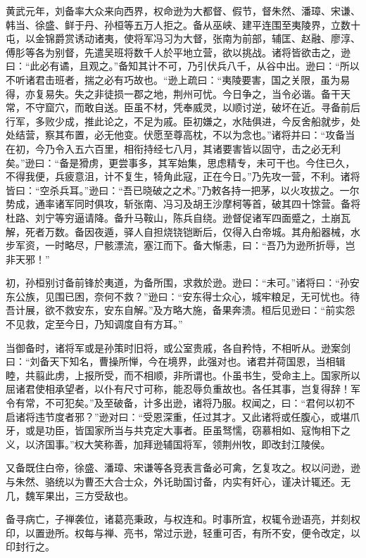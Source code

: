 \documentclass[12pt,UTF8]{ctexbook}
\begin{document}
黄武元年，刘备率大众来向西界，权命逊为大都督、假节，督朱然、潘璋、宋谦、韩当、徐盛、鲜于丹、孙桓等五万人拒之。备从巫峡、建平连围至夷陵界，立数十屯，以金锦爵赏诱动诸夷，使将军冯习为大督，张南为前部，辅匡、赵融、廖淳、傅肜等各为别督，先遣吴班将数千人於平地立营，欲以挑战。诸将皆欲击之，逊曰：“此必有谲，且观之。”备知其计不可，乃引伏兵八千，从谷中出。逊曰：“所以不听诸君击班者，揣之必有巧故也。“逊上疏曰：“夷陵要害，国之关限，虽为易得，亦复易失。失之非徒损一郡之地，荆州可忧。今日争之，当令必谐。备干天常，不守窟穴，而敢自送。臣虽不材，凭奉威灵，以顺讨逆，破坏在近。寻备前后行军，多败少成，推此论之，不足为戚。臣初嫌之，水陆俱进，今反舍船就步，处处结营，察其布置，必无他变。伏愿至尊高枕，不以为念也。”诸将并曰：“攻备当在初，今乃令入五六百里，相衔持经七八月，其诸要害皆以固守，击之必无利矣。”逊曰：“备是猾虏，更尝事多，其军始集，思虑精专，未可干也。今住已久，不得我便，兵疲意沮，计不复生，犄角此寇，正在今日。”乃先攻一营，不利。诸将皆曰：“空杀兵耳。”逊曰：“吾已晓破之之术。”乃敕各持一把茅，以火攻拔之。一尔势成，通率诸军同时俱攻，斩张南、冯习及胡王沙摩柯等首，破其四十馀营。备将杜路、刘宁等穷逼请降。备升马鞍山，陈兵自绕。逊督促诸军四面蹙之，土崩瓦解，死者万数。备因夜遁，驿人自担烧铙铠断后，仅得入白帝城。其舟船器械，水步军资，一时略尽，尸骸漂流，塞江而下。备大惭恚，曰：“吾乃为逊所折辱，岂非天邪！”

初，孙桓别讨备前锋於夷道，为备所围，求救於逊。逊曰：“未可。”诸将曰：“孙安东公族，见围已困，奈何不救？”逊曰：“安东得士众心，城牢粮足，无可忧也。待吾计展，欲不救安东，安东自解。”及方略大施，备果奔溃。桓后见逊曰：“前实怨不见救，定至今日，乃知调度自有方耳。”

当御备时，诸将军或是孙策时旧将，或公室贵戚，各自矜恃，不相听从。逊案剑曰：“刘备天下知名，曹操所惮，今在境界，此强对也。诸君并荷国恩，当相辑睦，共翦此虏，上报所受，而不相顺，非所谓也。仆虽书生，受命主上。国家所以屈诸君使相承望者，以仆有尺寸可称，能忍辱负重故也。各任其事，岂复得辞！军令有常，不可犯矣。”及至破备，计多出逊，诸将乃服。权闻之，曰：“君何以初不启诸将违节度者邪？”逊对曰：“受恩深重，任过其才。又此诸将或任腹心，或堪爪牙，或是功臣，皆国家所当与共克定大事者。臣虽驽懦，窃慕相如、寇恂相下之义，以济国事。”权大笑称善，加拜逊辅国将军，领荆州牧，即改封江陵侯。

又备既住白帝，徐盛、潘璋、宋谦等各竞表言备必可禽，乞复攻之。权以问逊，逊与朱然、骆统以为曹丕大合士众，外讬助国讨备，内实有奸心，谨决计辄还。无几，魏军果出，三方受敌也。

备寻病亡，子禅袭位，诸葛亮秉政，与权连和。时事所宜，权辄令逊语亮，并刻权印，以置逊所。权每与禅、亮书，常过示逊，轻重可否，有所不安，便令改定，以印封行之。
\end{document}
